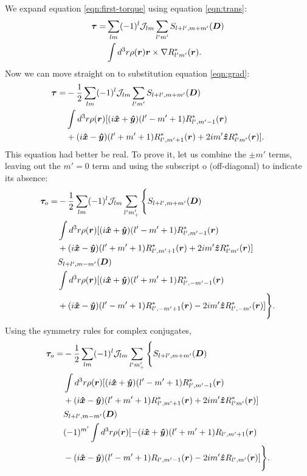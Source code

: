 \documentclass[aps,twocolumn,secnumarabic,balancelastpage,amsmath,amssymb,nofootinbib,floatfix]{revtex4-1}
\begin{document}
We expand equation \ref{eqn:first-torque} using equation \ref{eqn:trans}:
\begin{equation*}
\begin{aligned}
\bm \tau = &\sum_{lm}(-1)^l\mathcal{J}_{lm}\sum_{l'm'}S_{l+l',m+m'}(\bm D) \\
&\int d^3 r \rho(\bm r) \bm r \times \nabla R^*_{l'm'}(\bm r).
\end{aligned}
\end{equation*}
Now we can move straight on to substitution equation \ref{eqn:grad}:
\begin{equation*}
\begin{aligned}
\bm \tau = &-\frac{1}{2}\sum_{lm}(-1)^l\mathcal{J}_{lm}\sum_{l'm'}S_{l+l',m+m'}(\bm D) \\
&\int d^3 r \rho(\bm r) [(i\bm{\hat x} + \bm{\hat y})(l'-m'+1)R^*_{l',m'-1}(\bm r)\\
&+(i\bm{\hat x}-\bm{\hat y})(l'+m'+1)R^*_{l',m'+1}(\bm r)+2im'\bm{\hat z} R^*_{l'm'}(\bm r)].
\end{aligned}
\end{equation*}
This equation had better be real. To prove it, let us combine the $\pm m'$ terms, leaving out the $m'=0$ term and using the subscript o (off-diagonal) to indicate its absence:
\begin{equation*}
\begin{aligned}
\bm \tau_o = &-\frac{1}{2}\sum_{lm}(-1)^l\mathcal{J}_{lm}\sum_{l'm'_+}\Bigg\{S_{l+l',m+m'}(\bm D) \\
&\int d^3 r \rho(\bm r) [(i\bm{\hat x} + \bm{\hat y})(l'-m'+1)R^*_{l',m'-1}(\bm r)\\
&+(i\bm{\hat x}-\bm{\hat y})(l'+m'+1)R^*_{l',m'+1}(\bm r)+2im'\bm{\hat z} R^*_{l'm'}(\bm r)]\\
&S_{l+l',m-m'}(\bm D) \\
&\int d^3 r \rho(\bm r) [(i\bm{\hat x} + \bm{\hat y})(l'+m'+1)R^*_{l',-m'-1}(\bm r)\\
&+(i\bm{\hat x}-\bm{\hat y})(l'-m'+1)R^*_{l',-m'+1}(\bm r)-2im'\bm{\hat z} R^*_{l',-m'}(\bm r)]\Bigg\}.
\end{aligned}
\end{equation*}
Using the symmetry rules for complex conjugates,
\begin{equation*}
\begin{aligned}
\bm \tau_o = &-\frac{1}{2}\sum_{lm}(-1)^l\mathcal{J}_{lm}\sum_{l'm'_+}\Bigg\{S_{l+l',m+m'}(\bm D) \\
&\int d^3 r \rho(\bm r) [(i\bm{\hat x} + \bm{\hat y})(l'-m'+1)R^*_{l',m'-1}(\bm r)\\
&+(i\bm{\hat x}-\bm{\hat y})(l'+m'+1)R^*_{l',m'+1}(\bm r)+2im'\bm{\hat z} R^*_{l'm'}(\bm r)]\\
&S_{l+l',m-m'}(\bm D) \\
&(-1)^{m'}\int d^3 r \rho(\bm r) [-(i\bm{\hat x} + \bm{\hat y})(l'+m'+1)R_{l',m'+1}(\bm r)\\
&-(i\bm{\hat x}-\bm{\hat y})(l'-m'+1)R_{l',m'-1}(\bm r)-2im'\bm{\hat z} R_{l',m'}(\bm r)]\Bigg\}.
\end{aligned}
\end{equation*}
\end{document}
